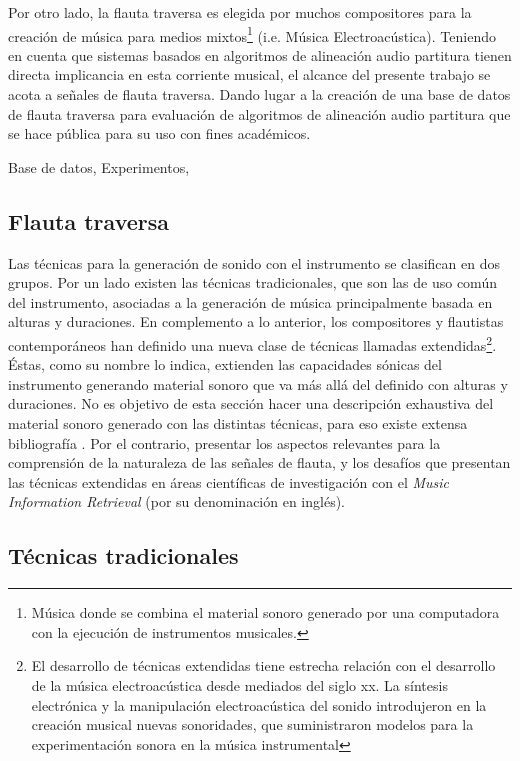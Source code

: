 \documentclass
  [ams,pdfout]%
	{aeslac}
\begin{document}
Por otro lado, la flauta traversa es elegida por muchos compositores para la creación de música para medios mixtos\footnote{Música donde se combina el material sonoro generado por una computadora con la ejecución de instrumentos musicales.} (i.e. Música Electroacústica). Teniendo en cuenta que sistemas basados en algoritmos de alineación audio partitura tienen directa implicancia en esta corriente musical, el alcance del presente trabajo se acota a señales de flauta traversa. Dando lugar a la creación de una base de datos de flauta traversa para evaluación de algoritmos de alineación audio partitura que se hace pública para su uso con fines académicos.

Base de datos,
Experimentos,


%
\subsection{Flauta traversa}

Las técnicas para la generación de sonido con el instrumento se clasifican en dos grupos. Por un lado existen las técnicas tradicionales, que son las de uso común del instrumento, asociadas a la generación de música principalmente basada en alturas y duraciones. En complemento a lo anterior, los compositores y flautistas contemporáneos han definido una nueva clase de técnicas llamadas extendidas\footnote{El desarrollo de técnicas extendidas tiene estrecha relación con el desarrollo de la música electroacústica desde mediados del siglo xx. La síntesis electrónica y la manipulación electroacústica del sonido introdujeron en la creación musical nuevas sonoridades, que suministraron modelos para la experimentación sonora en la música instrumental}. Éstas, como su nombre lo indica, extienden las capacidades sónicas del instrumento generando material sonoro que va más allá del definido con alturas y duraciones. No es objetivo de esta sección hacer una descripción exhaustiva del material sonoro generado con las distintas técnicas, para eso existe extensa bibliografía \cite{piston1955orchestration,samuel2002study,dick1975other}. Por el contrario, presentar los aspectos relevantes para la comprensión de la naturaleza de las señales de flauta, y los desafíos que presentan las técnicas extendidas en áreas científicas de investigación con el \textit{Music Information Retrieval} (por su denominación en inglés).   


\subsection{Técnicas tradicionales}
\end{document}

